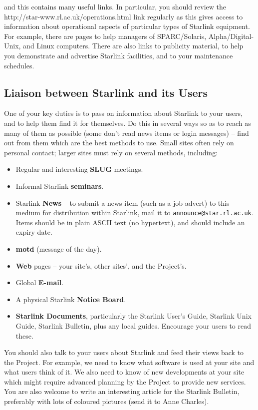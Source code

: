 and this contains many useful links.
In particular, you should review the 
{http://star-www.rl.ac.uk/operations.html}
link regularly as this gives access to information about operational aspects of
particular types of Starlink equipment.
For example, there are pages to help managers of SPARC/Solaris,
Alpha/Digital-Unix, and Linux computers.
There are also links to publicity material, to help you demonstrate and
advertise Starlink facilities, and to your maintenance schedules.

\subsection {Liaison between Starlink and its Users}

One of your key duties is to pass on information about Starlink to your users,
and to help them find it for themselves.
Do this in several ways so as to reach as many of them as possible (some don't
read news items or login messages) --  find out from them which are the best
methods to use.
Small sites often rely on personal contact; larger sites must rely on several
methods, including:

\begin{itemize}
\item Regular and interesting {\bf SLUG} meetings.
\item Informal Starlink {\bf seminars}.
\item Starlink {\bf News} -- to submit a news item (such as a job advert) to
 this medium for distribution within Starlink, mail it to
 {\tt announce@star.rl.ac.uk}.
 Items should be in plain ASCII text (no hypertext), and should include an
 expiry date.
\item {\bf motd} (message of the day).
\item {\bf Web} pages -- your site's, other sites', and the Project's.
\item Global {\bf E-mail}.
\item A physical Starlink {\bf Notice Board}.
\item {\bf Starlink Documents}, particularly the Starlink User's Guide, 
 Starlink Unix Guide, Starlink Bulletin, plus any local guides.
 Encourage your users to read these.
\end{itemize}

You should also talk to your users about Starlink and feed their views back to
the Project.
For example, we need to know what software is used at your site and what users
think of it.
We also need to know of new developments at your site which might require
advanced planning by the Project to provide new services.
You are also welcome to write an interesting article for the Starlink Bulletin,
preferably with lots of coloured pictures (send it to Anne Charles).

